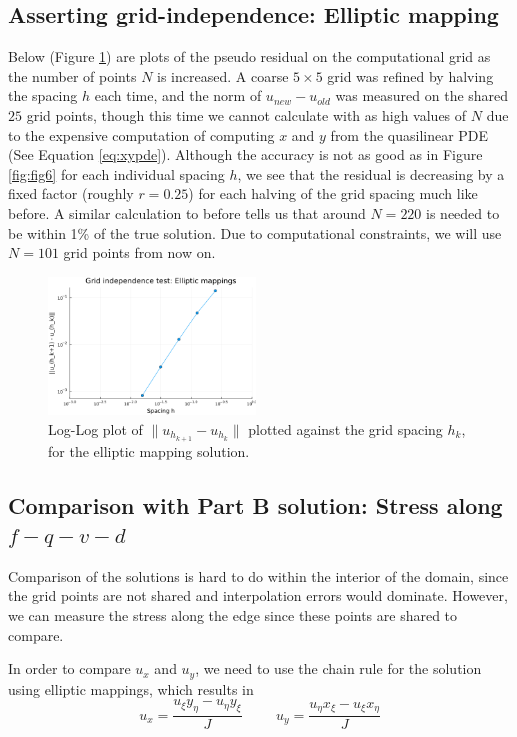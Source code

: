 \documentclass{article}
\numberwithin{equation}{section}
\theoremstyle{definition}
\begin{document}
\subsection{Asserting grid-independence: Elliptic mapping}
Below (Figure \ref{fig:fig14}) are plots of the pseudo residual on the computational grid as the number of points $N$ is increased. A coarse $5 \times 5$ grid was refined by halving the spacing $h$ each time, and the norm of $u_{new} - u_{old}$ was measured on the shared $25$ grid points, though this time we cannot calculate with as high values of $N$ due to the expensive computation of computing $x$ and $y$ from the quasilinear PDE (See Equation \eqref{eq:xypde}). Although the accuracy is not as good as in Figure \ref{fig:fig6} for each individual spacing $h$, we see that the residual is decreasing by a fixed factor (roughly $r=0.25$) for each halving of the grid spacing much like before. A similar calculation to before tells us that around $N=220$ is needed to be within 1\% of the true solution. Due to computational constraints, we will use $N=101$ grid points from now on.

\begin{figure}[H]
    \centering
    \includegraphics[width=0.49\textwidth]{fig14.png}
    \caption{Log-Log plot of $\|u_{h_{k+1}} - u_{h_k}\|$ plotted against the grid spacing $h_k$, for the elliptic mapping solution.}
    \label{fig:fig14}
\end{figure}

\subsection{Comparison with Part B solution: Stress along $f-q-v-d$}
Comparison of the solutions is hard to do within the interior of the domain, since the grid points are not shared and interpolation errors would dominate. However, we can measure the stress along the edge since these points are shared to compare.

In order to compare $u_x$ and $u_y$, we need to use the chain rule for the solution using elliptic mappings, which results in
\begin{equation}
    u_x = \frac{u_{\xi} y_{\eta} - u_{\eta} y_{\xi}}{J} \hspace{1cm} 
    u_y = \frac{u_{\eta} x_{\xi} - u_{\xi} x_{\eta}}{J}
\end{equation}
\end{document}

